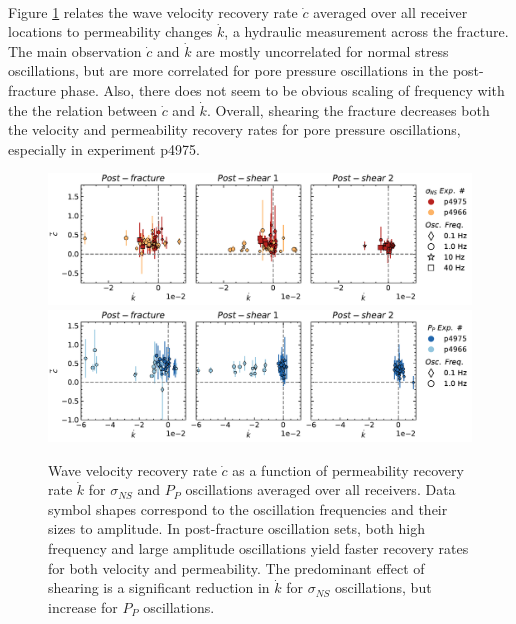 \documentclass[letterpaper,10pt]{article}
\begin{document}
\clearpage

\paragraph{}
Figure \ref{fig:avg_recov_plots} relates the wave velocity recovery rate $ \dot c $ averaged over all receiver locations to permeability changes $ \dot k $, a hydraulic measurement across the fracture. The main observation $ \dot c $ and $ \dot k $ are mostly uncorrelated for normal stress oscillations, but are more correlated for pore pressure oscillations in the post-fracture phase. Also, there does not seem to be obvious scaling of frequency with the the relation between 
$ \dot c $ and $ \dot k $. Overall, shearing the fracture decreases both the velocity and permeability recovery rates for pore pressure oscillations, especially in experiment p4975. 

\clearpage

\begin{figure}[ht]
	\centering
	\includegraphics[width=1\columnwidth]{avg_recov_All_ampsNS}
	\includegraphics[width=1\columnwidth]{avg_recov_All_ampsPP}
	\caption{Wave velocity recovery rate $ \dot c $ as a function of permeability recovery rate $ \dot k$ for $ \sigma_{NS} $ and $ P_P $ oscillations averaged over all receivers. Data symbol shapes correspond to the oscillation frequencies and their sizes to amplitude. In post-fracture oscillation sets, both high frequency and large amplitude oscillations yield faster recovery rates for both velocity and permeability. The predominant effect of shearing is a significant reduction in $ \dot k $ for $ \sigma_{NS} $ oscillations, but increase for  $ P_P $ oscillations.}
	\label{fig:avg_recov_plots}
\end{figure}
\end{document}
